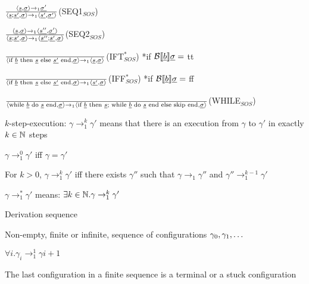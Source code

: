 		\item $\frac{\langle \underline{s}, \underline{\sigma} \rangle \rightarrow_1 \underline{\sigma'}}{\langle \underline{s};\underline{s'}, \underline{\sigma} \rangle \rightarrow_1 \langle \underline{s'}, \underline{\sigma'} \rangle}$(SEQ1$_{SOS}$)
		\item $\frac{\langle \underline{s}, \underline{\sigma} \rangle \rightarrow_1 \langle \underline{s''}, \underline{\sigma'} \rangle}{\langle \underline{s};\underline{s'}, \underline{\sigma} \rangle \rightarrow_1 \langle \underline{s''};\underline{s'}, \underline{\sigma} \rangle}$(SEQ2$_{SOS}$)
		\item $\frac{}{\langle \text{if }\underline{b}\text{ then }\underline{s}\text{ else }\underline{s'}\text{ end}, \underline{\sigma} \rangle \rightarrow_1 \langle \underline{s}, \underline{\sigma} \rangle}$(IFT$^*_{SOS}$) *if $\mathcal{B} \llbracket \underline{b} \rrbracket \underline{\sigma} =$ tt
		\item $\frac{}{\langle \text{if }\underline{b}\text{ then }\underline{s}\text{ else }\underline{s'}\text{ end}, \underline{\sigma} \rangle \rightarrow_1 \langle \underline{s'}, \underline{\sigma} \rangle}$(IFF$^*_{SOS}$) *if $\mathcal{B} \llbracket \underline{b} \rrbracket \underline{\sigma} =$ ff
		\item $\frac{}{\langle\text{while } \underline{b} \text{ do }\underline{s} \text{ end}, \underline{\sigma}\rangle \rightarrow_1 \langle \text{if }\underline{b} \text{ then }\underline{s};\text{ while }\underline{b} \text{ do } \underline{s}\text{ end else skip end}, \underline{\sigma}\rangle}$(WHILE$_{SOS}$)
		\item $k$-step-execution: $\gamma \rightarrow_1^k \gamma'$ means that there is an execution from $\gamma$ to $\gamma'$ in exactly $k \in \mathbb{N}$ steps
		\enumstart
			\item $\gamma \rightarrow_1^0 \gamma'$ iff $\gamma = \gamma'$
			\item For $k > 0$, $\gamma \rightarrow_1^k \gamma'$ iff there exists $\gamma''$ such that $\gamma \rightarrow_1 \gamma''$ and $\gamma'' \rightarrow_1^{k-1} \gamma'$
			\item $\gamma \rightarrow_1^* \gamma'$ means: $\exists k \in \mathbb{N}.\gamma \rightarrow_1^k \gamma'$
		\enumend
	\enumend
	\item Derivation sequence
	\enumstart
		\item Non-empty, finite or infinite, sequence of configurations $\gamma_0, \gamma_1, \mathellipsis$
		\item $\forall i. \gamma_i \rightarrow_1^1 \gamma{i+1}$
		\item The last configuration in a finite sequence is a terminal or a stuck configuration
